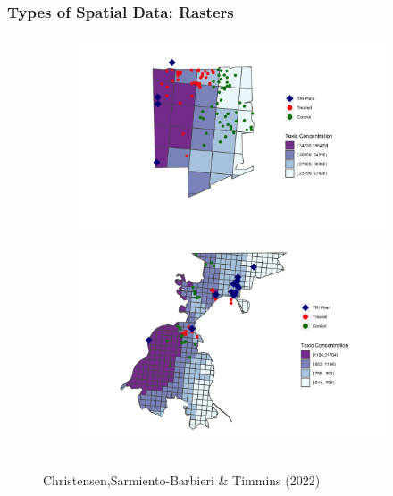 \documentclass[
  shownotes,
  xcolor={svgnames},
  hyperref={colorlinks,citecolor=DarkBlue,linkcolor=andesred,urlcolor=DarkBlue}
  , aspectratio=169]{beamer}
\begin{document}
\begin{frame}[fragile]
\frametitle{Types of Spatial Data: Rasters}

\begin{figure}[H] \centering
  \centering
  
\begin{subfigure}{0.45\linewidth}
\includegraphics[scale=0.08]{figures/ZIP_A.png}
\end{subfigure}
\begin{subfigure}{0.45\linewidth}
\includegraphics[scale=0.08]{figures/ZIP_B.png}

\end{subfigure}
  \\
  \tiny Christensen,Sarmiento-Barbieri  \& Timmins (2022)
\end{figure}


\end{frame}
\end{document}

